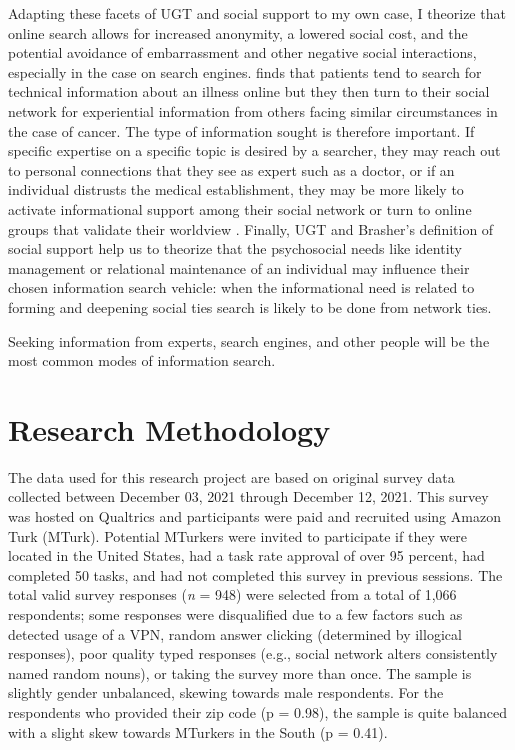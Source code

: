 Adapting these facets of UGT and social support to my own case, I theorize that
online search allows for increased anonymity, a lowered social cost, and the
potential avoidance of embarrassment and other negative social interactions,
especially in the case on search engines. \citet{rainsCopingIllnessDigitally2018}
finds that patients tend to search for
technical information about an illness online but they then turn to their social
network for experiential information from others facing similar circumstances in
the case of cancer. The type of information sought is therefore important.
If specific expertise on a specific topic is desired by a searcher, they may
reach out to personal connections that they see as expert such as a doctor, or
if an individual distrusts the medical establishment, they may be more likely to
activate informational support among their social network or turn to online
groups that validate their worldview \citep{bogersHowSocialAre2014}. Finally, UGT and
Brasher's definition of social support \citeyearpar{brashersInformationSeekingAvoiding2002}
help us to theorize that the psychosocial needs like identity management or relational
maintenance of an individual may influence their chosen information search vehicle: 
when the informational need is related to forming and deepening social ties search 
is likely to be done from network ties.

\begin{hyp} \label{hyp:drgooglefriend}
Seeking information from experts, search engines, and other people
will be the most common modes of information search. 
\end{hyp}

\hypertarget{research-methodology}{%
\section{Research Methodology}\label{research-methodology}}

The data used for this research project are based on original survey data
collected between December 03, 2021 through December 12, 2021.
This survey was hosted on Qualtrics and participants were paid and 
recruited using Amazon Turk (MTurk). Potential MTurkers were invited
to participate if they were located in the United States, had a task
rate approval of over 95 percent, had completed 50 tasks, and had not 
completed this survey in previous sessions. The total valid 
survey responses (\emph{n} = 948) were selected from a total of 1,066
respondents; some responses were disqualified due to a few factors such as
detected usage of a VPN, random answer clicking (determined by illogical
responses), poor quality typed responses (e.g., social network alters
consistently named random nouns), or taking the survey more than once. The sample
is slightly gender unbalanced, skewing towards male respondents. For the
respondents who provided their zip code (p = 0.98), the sample is quite balanced with
a slight skew towards MTurkers in the South (p = 0.41).

